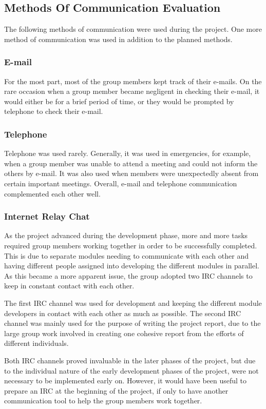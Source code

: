 \subsection{Methods Of Communication Evaluation}

The following methods of communication were used
during the project. One more method of communication
was used in addition to the planned methods.

\subsubsection{E-mail}

For the most part, most of the group members kept track
of their e-mails. On the rare occasion when a group member
became negligent in checking their e-mail, it would either be 
for a brief period of time, or they would be prompted by
telephone to check their e-mail.

\subsubsection{Telephone}

Telephone was used rarely. Generally, it was used in 
emergencies, for example, 
when a group member was unable to attend a meeting
and could not inform the others by e-mail. It was also
used when members were unexpectedly absent from 
certain important meetings. Overall, e-mail and 
telephone communication complemented each other well.

\subsubsection{Internet Relay Chat}

As the project advanced during the development phase,
more and more tasks required group members working together
in order to be successfully completed. This is due to 
separate modules needing to communicate with each other
and having different people assigned into developing the different modules
in parallel. As this became a more apparent issue, the group adopted
two IRC channels to keep in constant contact with each other.

The first IRC channel was used for development and keeping the 
different module developers in contact with each other as much as possible. 
The second IRC channel was mainly used for the purpose of writing the project
report, due to the large group work involved in creating one cohesive report
from the efforts of different individuals.

Both IRC channels proved invaluable in the later phases of the project, but
due to the individual nature of the early development phases of the project,
were not necessary to be implemented early on. However, it would have been
useful to prepare an IRC at the beginning of the project, if only to have 
another communication tool to help the group members work together.